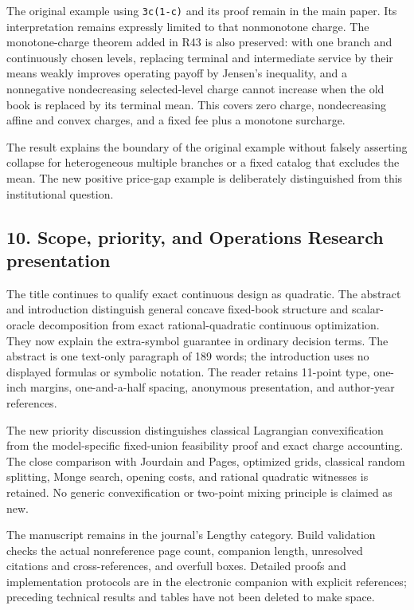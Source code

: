 \documentclass[11pt,letterpaper]{article}
\begin{document}
The original example using \nolinkurl{3c(1-c)} and its proof remain in the main paper. Its interpretation remains expressly limited to that nonmonotone charge. The monotone-charge theorem added in R43 is also preserved: with one branch and continuously chosen levels, replacing terminal and intermediate service by their means weakly improves operating payoff by Jensen's inequality, and a nonnegative nondecreasing selected-level charge cannot increase when the old book is replaced by its terminal mean. This covers zero charge, nondecreasing affine and convex charges, and a fixed fee plus a monotone surcharge.



The result explains the boundary of the original example without falsely asserting collapse for heterogeneous multiple branches or a fixed catalog that excludes the mean. The new positive price-gap example is deliberately distinguished from this institutional question.



\subsection*{10. Scope, priority, and Operations Research presentation}


The title continues to qualify exact continuous design as quadratic. The abstract and introduction distinguish general concave fixed-book structure and scalar-oracle decomposition from exact rational-quadratic continuous optimization. They now explain the extra-symbol guarantee in ordinary decision terms. The abstract is one text-only paragraph of 189 words; the introduction uses no displayed formulas or symbolic notation. The reader retains 11-point type, one-inch margins, one-and-a-half spacing, anonymous presentation, and author-year references.



The new priority discussion distinguishes classical Lagrangian convexification from the model-specific fixed-union feasibility proof and exact charge accounting. The close comparison with Jourdain and Pages, optimized grids, classical random splitting, Monge search, opening costs, and rational quadratic witnesses is retained. No generic convexification or two-point mixing principle is claimed as new.



The manuscript remains in the journal's Lengthy category. Build validation checks the actual nonreference page count, companion length, unresolved citations and cross-references, and overfull boxes. Detailed proofs and implementation protocols are in the electronic companion with explicit references; preceding technical results and tables have not been deleted to make space.
\end{document}
